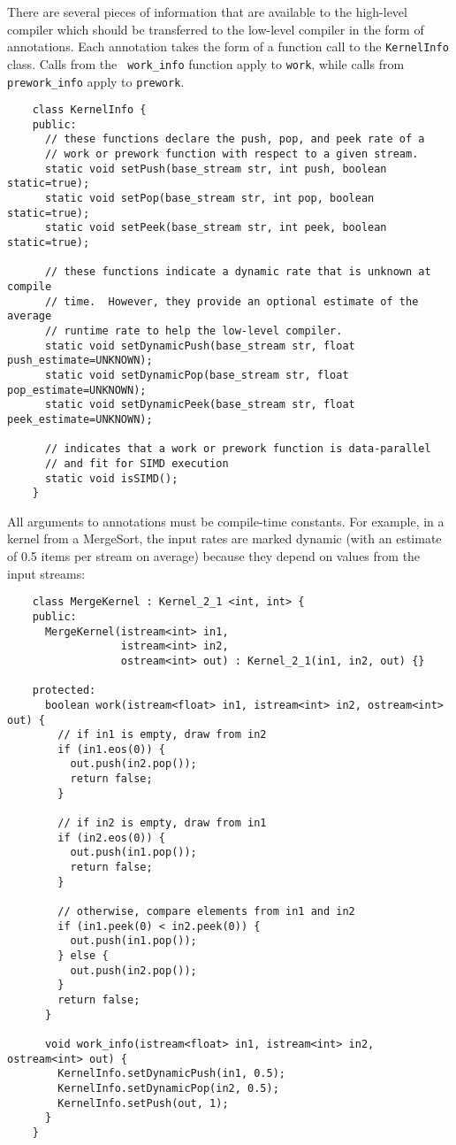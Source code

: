 
There are several pieces of information that are available to the
high-level compiler which should be transferred to the low-level
compiler in the form of annotations.  Each annotation takes the form
of a function call to the {\tt KernelInfo} class.  Calls from the {\tt
work\_info} function apply to {\tt work}, while calls from {\tt
prework\_info} apply to {\tt prework}.
{\small
\begin{verbatim}
    class KernelInfo {
    public:
      // these functions declare the push, pop, and peek rate of a
      // work or prework function with respect to a given stream.
      static void setPush(base_stream str, int push, boolean static=true);
      static void setPop(base_stream str, int pop, boolean static=true);
      static void setPeek(base_stream str, int peek, boolean static=true);

      // these functions indicate a dynamic rate that is unknown at compile
      // time.  However, they provide an optional estimate of the average
      // runtime rate to help the low-level compiler.
      static void setDynamicPush(base_stream str, float push_estimate=UNKNOWN);
      static void setDynamicPop(base_stream str, float pop_estimate=UNKNOWN);
      static void setDynamicPeek(base_stream str, float peek_estimate=UNKNOWN);

      // indicates that a work or prework function is data-parallel 
      // and fit for SIMD execution
      static void isSIMD();
    }  
\end{verbatim}}

All arguments to annotations must be compile-time constants.  For
example, in a kernel from a MergeSort, the input rates are marked
dynamic (with an estimate of 0.5 items per stream on average) because
they depend on values from the input streams:
{\small
\begin{verbatim}
    class MergeKernel : Kernel_2_1 <int, int> {
    public:
      MergeKernel(istream<int> in1, 
                  istream<int> in2, 
                  ostream<int> out) : Kernel_2_1(in1, in2, out) {}

    protected:
      boolean work(istream<float> in1, istream<int> in2, ostream<int> out) {
        // if in1 is empty, draw from in2
        if (in1.eos(0)) {          
          out.push(in2.pop());
          return false;
        }

        // if in2 is empty, draw from in1
        if (in2.eos(0)) {
          out.push(in1.pop());
          return false;
        } 

        // otherwise, compare elements from in1 and in2
        if (in1.peek(0) < in2.peek(0)) {
          out.push(in1.pop());
        } else {
          out.push(in2.pop());
        }
        return false;
      }

      void work_info(istream<float> in1, istream<int> in2, ostream<int> out) {
        KernelInfo.setDynamicPush(in1, 0.5);
        KernelInfo.setDynamicPop(in2, 0.5);
        KernelInfo.setPush(out, 1);
      }
    }  
\end{verbatim}}

